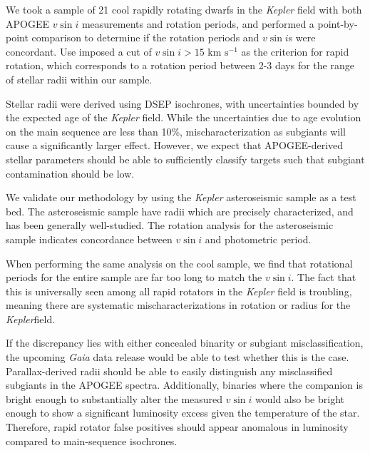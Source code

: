 \documentclass[manuscript]{aastex6}
\newcommand{\vsini}{\ensuremath{v \sin i}}
\newcommand{\Kepler}{\mbox{\textit{Kepler}}}
\newcommand{\Gaia}{\mbox{\textit{Gaia}}}
\newcommand{\kms}{\textrm{ km~s}\ensuremath{^{-1}}}
\begin{document}
We took a sample of 21 cool rapidly rotating dwarfs in the \Kepler{} field with 
both APOGEE \vsini{} measurements and \citet{McQuillan14} rotation periods, and 
performed a point-by-point comparison to determine if the rotation periods and
\vsini{}s were concordant. Use imposed a cut of \(\vsini > 15 \kms\) as the
criterion for rapid rotation, which corresponds to a rotation period between
2-3 days for the range of stellar radii within our sample.

Stellar radii were derived using DSEP isochrones, with uncertainties bounded by
the expected age of the \Kepler{} field. While the uncertainties due to age
evolution on the main sequence are less than 10\%, mischaracterization as
subgiants will cause a significantly larger effect. However, we expect that
APOGEE-derived stellar parameters should be able to sufficiently classify
targets such that subgiant contamination should be low.

We validate our methodology by using the \Kepler{} asteroseismic sample as a
test bed. The asteroseismic sample have radii which are precisely
characterized, and has been generally well-studied. The rotation analysis for
the asteroseismic sample indicates concordance between \vsini{} and photometric
period.

When performing the same analysis on the cool sample, we find that rotational
periods for the entire sample are far too long to match the \vsini{}. The fact
that this is universally seen among all rapid rotators in the \Kepler{} field
is troubling, meaning there are systematic mischaracterizations in rotation or
radius for the \Kepler field.

If the discrepancy lies with either concealed binarity or subgiant
misclassification, the upcoming \Gaia{} data release would be able to
test whether this is the case. Parallax-derived radii should be able to
easily distinguish any misclassified subgiants in the APOGEE spectra.
Additionally, binaries where the companion is bright enough to
substantially alter the measured \vsini{} would also be bright enough to
show a significant luminosity excess given the temperature of the star.
Therefore, rapid rotator false positives should appear anomalous in
luminosity compared to main-sequence isochrones.




\end{document}
